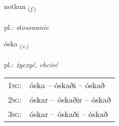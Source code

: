 \documentclass[frontgrid, backgrid]{flacards}\usepackage[]{graphicx}\usepackage[]{xcolor}
\begin{document}
\renewcommand{\flhead}{\vskip5pt \fboxsep=0pt {\small\bfseries\footnotesize Nafnorð | Noun}}
\renewcommand{\fcfoot}{\vskip5pt \fboxsep=0pt \hspace{2pt}{\small\bfseries\footnotesize 1K}}

\renewcommand{\blhead}{\vskip5pt {\small\bfseries\footnotesize Nafnorð | Noun }}
\renewcommand{\bcfoot}{\vskip5pt \hspace{2pt}{\small\bfseries\footnotesize 1K}}


{notkun \small{\textsubscript{(\textit{f.})}} \\[1ex] %
\textphonetic{[nɔtkʏn]} \\
pl.: \emph{stosowanie} \\  [2ex]
\renewcommand*{\arraystretch}{0.8}
}

\renewcommand{\flhead}{\vskip5pt \fboxsep=0pt {\small\bfseries\footnotesize Sagnorð | Verb}}
\renewcommand{\fcfoot}{\vskip5pt \fboxsep=0pt \hspace{2pt}{\small\bfseries\footnotesize 1K}}

\renewcommand{\blhead}{\vskip5pt {\small\bfseries\footnotesize Sagnorð | Verb }}
\renewcommand{\bcfoot}{\vskip5pt \hspace{2pt}{\small\bfseries\footnotesize 1K}}


{óska \small{\textsubscript{(\textit{v.})}} \\[1ex] %
\textphonetic{[ouska]} \\
pl.: \emph{życzyć, chcieć} \\  [2ex]
\renewcommand*{\arraystretch}{0.8}
\begin{tabular}{p{1cm}l}
\textsc{1sg}: & óska -- óskaði -- óskað \\ 
\textsc{2sg}: & óskar -- óskaðir -- óskað \\ 
\textsc{3sg}: & óskar -- óskaði -- óskað \\ 
\end{tabular}
}
\end{document}
